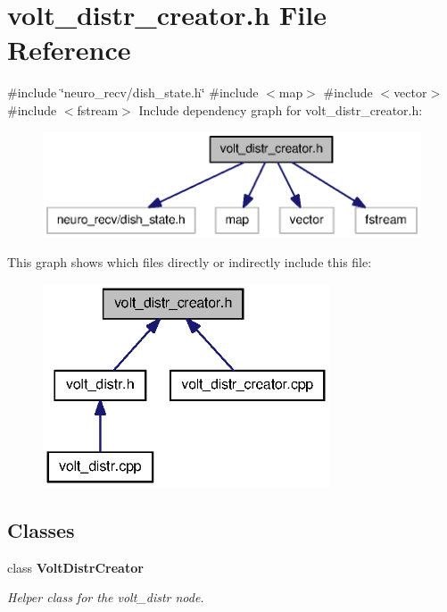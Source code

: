 \section{volt\-\_\-distr\-\_\-creator.\-h \-File \-Reference}
\label{volt__distr__creator_8h}
{\ttfamily \#include \char`\"{}neuro\-\_\-recv/dish\-\_\-state.\-h\char`\"{}}\*
{\ttfamily \#include $<$map$>$}\*
{\ttfamily \#include $<$vector$>$}\*
{\ttfamily \#include $<$fstream$>$}\*
\-Include dependency graph for volt\-\_\-distr\-\_\-creator.\-h\-:
\nopagebreak
\begin{figure}[H]
\begin{center}
\leavevmode
\includegraphics[width=346pt]{volt__distr__creator_8h__incl}
\end{center}
\end{figure}
\-This graph shows which files directly or indirectly include this file\-:
\nopagebreak
\begin{figure}[H]
\begin{center}
\leavevmode
\includegraphics[width=241pt]{volt__distr__creator_8h__dep__incl}
\end{center}
\end{figure}
\subsection*{\-Classes}
\begin{DoxyCompactItemize}
\item 
class {\bf \-Volt\-Distr\-Creator}
\begin{DoxyCompactList}\small\item\em \-Helper class for the volt\-\_\-distr node. \end{DoxyCompactList}\end{DoxyCompactItemize}
